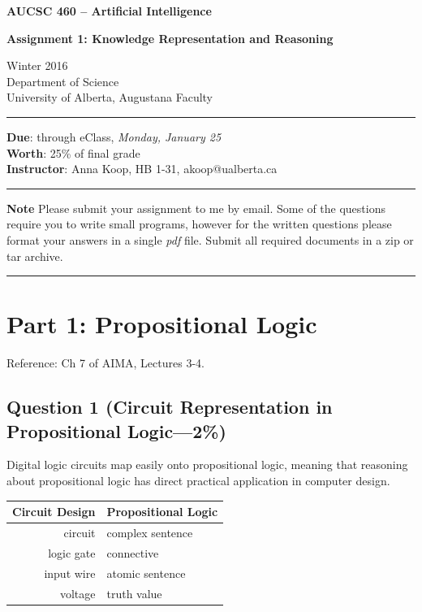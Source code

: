 \documentclass[12pt]{article}
\begin{document}
\noindent
{\Large\bf AUCSC 460 -- Artificial Intelligence}

\vspace*{1\baselineskip}

\noindent
{\large\bf Assignment 1: Knowledge Representation and Reasoning}

\vspace*{1\baselineskip}

\noindent
Winter 2016\\
Department of Science\\
University of Alberta, Augustana Faculty

\vspace*{1.75\baselineskip}
\hrule

\vspace*{0.75\baselineskip}

\noindent
{\bf Due}: through eClass, {\em Monday, January 25}\\
{\bf Worth}: 25\% of final grade
\\
{\bf Instructor}: Anna Koop, HB 1-31, akoop@ualberta.ca

\vspace*{0.75\baselineskip}

\hrule

\vspace*{1\baselineskip}

\noindent
{\bf Note}
Please submit your assignment to me by email.
Some of the questions require you to write small programs,
however for the written questions please format your answers
in a single {\em pdf} file.
Submit all required documents in a zip or tar archive.


\vspace*{1\baselineskip}

\hrule

\section*{Part 1: Propositional Logic}
Reference: Ch 7 of AIMA, Lectures 3-4.

\subsection*{Question 1 \rm(Circuit Representation in Propositional Logic---2\%)}
Digital logic circuits map easily onto propositional logic, meaning that reasoning about propositional logic has direct practical application in computer design.
\begin{center}
\begin{tabular}[h]{r | l}
Circuit Design & Propositional Logic \\
\hline
circuit & complex sentence\\
logic gate & connective \\
input wire & atomic sentence \\
voltage & truth value
\end{tabular}
\end{center}
\end{document}
